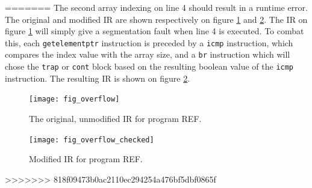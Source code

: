\documentclass{article}
\begin{document}
=======
The second array indexing on line 4 should result in a runtime error. The original and modified IR are shown respectively on figure \ref{fig:original_ir} and \ref{fig:modified_ir}. The IR on figure \ref{fig:original_ir} will simply give a segmentation fault when line 4 is executed. To combat this, each \texttt{getelementptr} instruction is preceded by a \texttt{icmp} instruction, which compares the index value with the array size, and a \texttt{br} instruction which will chose the \texttt{trap} or \texttt{cont} block based on the resulting boolean value of the \texttt{icmp} instruction. The resulting IR is shown on figure \ref{fig:modified_ir}.

\begin{figure}
	\texttt{[image: fig\_overflow]}
	\caption{The original, unmodified IR for program REF.}
	\label{fig:original_ir}
\end{figure}

\begin{figure}
	\texttt{[image: fig\_overflow\_checked]}
	\caption{Modified IR for program REF.}
	\label{fig:modified_ir}
\end{figure}



>>>>>>> 818f09473b0ac2110ec294254a476bf5dbf0865f
\end{document}
